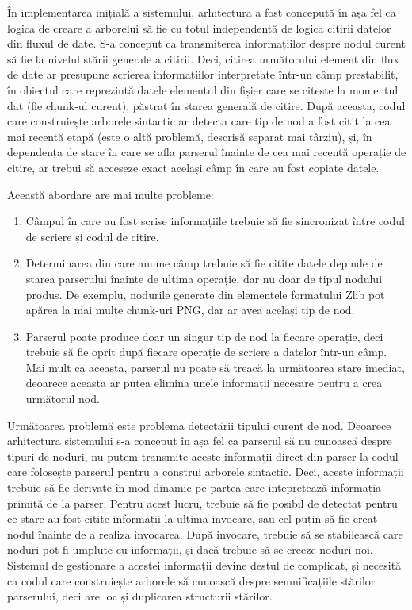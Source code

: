 \documentclass[a4paper,12pt]{report}
\begin{document}
În implementarea inițială a sistemului, arhitectura a fost concepută în așa fel ca
logica de creare a arborelui să fie cu totul independentă de logica citirii datelor din fluxul de date.
S-a conceput ca transmiterea informațiilor despre nodul curent să fie la nivelul stării generale a citirii.
Deci, citirea următorului element din flux de date ar presupune scrierea informațiilor interpretate
într-un câmp prestabilit, în obiectul care reprezintă datele elementul
din fișier care se citește la momentul dat (fie chunk-ul curent), păstrat în starea generală de citire.
După aceasta, codul care construiește arborele sintactic ar detecta care tip de nod a fost citit la cea mai recentă etapă 
(este o altă problemă, descrisă separat mai târziu),
și, în dependența de stare în care se afla parserul înainte de cea mai recentă operație de citire,
ar trebui să acceseze exact același câmp în care au fost copiate datele.

Această abordare are mai multe probleme:
\begin{enumerate}
    \item
        Câmpul în care au fost scrise informațiile trebuie să fie sincronizat
        între codul de scriere și codul de citire.
    \item
        Determinarea din care anume câmp trebuie să fie citite datele
        depinde de starea parserului înainte de ultima operație,
        dar nu doar de tipul nodului produs.
        De exemplu, nodurile generate din elementele formatului Zlib pot apărea
        la mai multe chunk-uri \ac{PNG}, dar ar avea același tip de nod.
    \item
        Parserul poate produce doar un singur tip de nod la fiecare operație, deci trebuie
        să fie oprit după fiecare operație de scriere a datelor într-un câmp.
        Mai mult ca aceasta, parserul nu poate să treacă la următoarea stare imediat,
        deoarece aceasta ar putea elimina unele informații necesare pentru a crea următorul nod.
\end{enumerate}

Următoarea problemă este problema detectării tipului curent de nod.
Deoarece arhitectura sistemului s-a conceput în așa fel ca parserul să nu cunoască despre tipuri de noduri,
nu putem transmite aceste informații direct din parser la codul care folosește parserul pentru
a construi arborele sintactic.
Deci, aceste informații trebuie să fie derivate în mod dinamic pe partea
care intepretează informația primită de la parser.
Pentru acest lucru, trebuie să fie posibil de detectat pentru ce stare au fost citite informații
la ultima invocare, sau cel puțin să fie creat nodul înainte de a realiza invocarea.
După invocare, trebuie să se stabilească care noduri pot fi umplute cu informații,
și dacă trebuie să se creeze noduri noi.
Sistemul de gestionare a acestei informații devine destul de complicat,
și necesită ca codul care construiește arborele să cunoască despre semnificațiile stărilor parserului,
deci are loc și duplicarea structurii stărilor.
\end{document}
